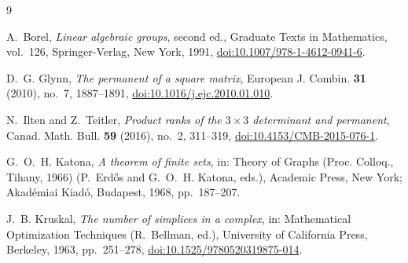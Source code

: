 \documentclass[11pt,reqno]{amsart}
\theoremstyle{definition}
\begin{document}
\begin{thebibliography}{9}

A.~Borel,
\emph{Linear algebraic groups}, second ed., Graduate Texts in Mathematics,
vol.~126, Springer-Verlag, New York, 1991,
\href{https://doi.org/10.1007/978-1-4612-0941-6}
{doi:10.1007/978-1-4612-0941-6}.

D.~G. Glynn,
\emph{The permanent of a square matrix},
European J. Combin. \textbf{31} (2010), no.~7, 1887--1891,
\href{https://doi.org/10.1016/j.ejc.2010.01.010}
{doi:10.1016/j.ejc.2010.01.010}.

N.~Ilten and Z.~Teitler,
\emph{Product ranks of the \(3\times3\) determinant and permanent},
Canad. Math. Bull. \textbf{59} (2016), no.~2, 311--319,
\href{https://doi.org/10.4153/CMB-2015-076-1}
{doi:10.4153/CMB-2015-076-1}.

G.~O.~H. Katona,
\emph{A theorem of finite sets}, in: Theory of Graphs (Proc. Colloq., Tihany,
1966) (P.~Erd\H{o}s and G.~O.~H. Katona, eds.), Academic Press, New York;
Akad\'emiai Kiad\'o, Budapest, 1968, pp.~187--207.

J.~B. Kruskal,
\emph{The number of simplices in a complex}, in: Mathematical Optimization
Techniques (R.~Bellman, ed.), University of California Press, Berkeley, 1963,
pp.~251--278,
\href{https://doi.org/10.1525/9780520319875-014}
{doi:10.1525/9780520319875-014}.

\end{thebibliography}
\end{document}

